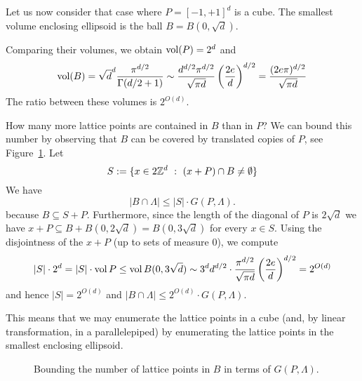 \begin{example}
  \label{example:cover-the-ball-with-cubes}
  Let us now consider that case where $P = [-1,+1]^d$ is a cube.
  The smallest volume enclosing ellipsoid is the ball $B = B(0, \sqrt{d})$.
  \begin{center}
  \end{center}
  Comparing their volumes, we obtain $\operatorname{vol}(P) = 2^d$ and
  \[
    \operatorname{vol}(B) = \sqrt{d}^d \frac{\pi^{d/2}}{\Gamma(d/2+1)} \sim \frac{d^{d/2} \pi^{d/2}}{\sqrt{\pi d}} \left( \frac{2e}{d} \right)^{d/2}
      = \frac{(2 e \pi)^{d/2}}{\sqrt{\pi d}}
  \]
  The ratio between these volumes is $2^{O(d)}$.

  How many more lattice points are contained in $B$ than in $P$?
  We can bound this number by observing that $B$ can be covered by translated copies of $P$,
  see Figure~\ref{fig:cover-B-by-P}.
  Let
  \[
    S := \{ x \in 2\mathbb{Z}^d ~:~ (x + P) \cap B \neq \emptyset \}
  \]
  We have
  \[
    |B \cap \Lambda| \leq |S| \cdot G(P, \Lambda).
  \]
  because $B \subseteq S + P$.
  Furthermore,
  since the length of the diagonal of $P$ is $2\sqrt{d}$
  we have $x + P \subseteq B + B(0,2\sqrt{d}) = B(0,3\sqrt{d})$ for every $x \in S$.
  Using the disjointness of the $x + P$ (up to sets of measure $0$),
  we compute
  \[
    |S| \cdot 2^d = |S| \cdot \operatorname{vol} P \leq \operatorname{vol} B(0,3\sqrt{d}) \sim 3^d d^{d/2} \cdot \frac{\pi^{d/2}}{\sqrt{\pi d}} \left( \frac{2e}{d} \right)^{d/2}
    = 2^{O(d)}
  \]
  and hence $|S| = 2^{O(d)}$ and $|B \cap \Lambda| \leq 2^{O(d)} \cdot G(P, \Lambda)$.

  This means that we may enumerate the lattice points in a cube
  (and, by linear transformation, in a parallelepiped)
  by enumerating the lattice points in the smallest enclosing ellipsoid.
\end{example}
\begin{figure}
  \begin{center}
  \end{center}
  \caption{Bounding the number of lattice points in $B$ in terms of $G(P,\Lambda)$.}
  \label{fig:cover-B-by-P}
\end{figure}

